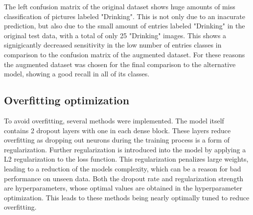 \noindent
The left confusion matrix of the original dataset shows huge amounts of miss classification of pictures labeled "Drinking". This is not only due to an inacurate prediction, but also due to the small amount of entries labeled "Drinking" in the original test data, with a total of only 25 "Drinking" images. This shows a signigicantly decreased sensitivity in the low number of entries classes in comparison to the confusion matrix of the augmented dataset. For these reasons the augmented dataset was chosen for the final comparison to the alternative model, showing a good recall in all of its classes.
\subsection{Overfitting optimization}
To avoid overfitting, several methods were implemented. The model itself contains 2 dropout layers with one in each dense block. These layers reduce overfitting as dropping out neurons during the training process is a form of regularization. Further regularization is introduced into the model by applying a L2 regularization to the loss function. This regularization penalizes large weights, leading to a reduction of the models complexity, which can be a reason for bad performance on unseen data. Both the dropout rate and regularization strength are hyperparameters, whose optimal values are obtained in the hyperparameter optimization. This leads to these methods being nearly optimally tuned to reduce overfitting.
